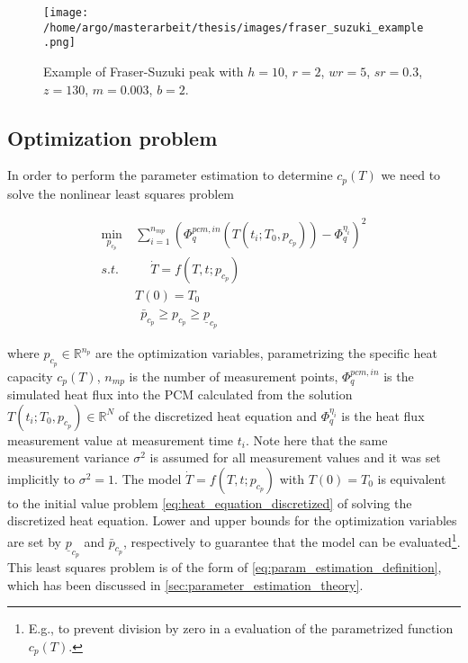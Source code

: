 \documentclass{scrartcl}[12pt, halfparskip]
\numberwithin{equation}{section}
\numberwithin{figure}{section}
\numberwithin{table}{section}
\begin{document}
\begin{figure}[H]
	\centering
	\texttt{[image: /home/argo/masterarbeit/thesis/images/fraser\_suzuki\_example.png]}
	\caption{Example of Fraser-Suzuki peak with $h=10$, $r=2$, $wr=5$, $sr=0.3$, $z=130$, $m=0.003$, $b=2$.}
	\label{fig:parametrization_example_fraser_suzuki}
\end{figure}











\newpage
\subsection{Optimization problem}
\label{sec:optimization_problem}
In order to perform the parameter estimation to determine $c_p(T)$ we need to solve the nonlinear least squares problem

\begin{align}
	\min_{p_{c_p}} \ & \sum_{i=1}^{n_{mp}} \left(  \varPhi_{q}^{pcm,in}(T(t_i;T_0,p_{c_p})) - \varPhi_q^{\eta_i} \right)^2 \label{eq:parameter_estimation_least_squares_problem} \\
	s.t. \ & \quad \  \dot{T} = f(T,t;p_{c_p}) \nonumber \\
	& T(0) = T_0 \nonumber \\
	& \ \ \bar{p}_{c_p} \ge p_{c_p} \ge \underline{p}_{c_p} \nonumber
\end{align}

where $p_{c_p} \in \mathbb{R}^{n_p}$ are the optimization variables, parametrizing the specific heat capacity $c_p(T)$, $n_{{mp}}$ is the number of measurement points, $\varPhi_{q}^{pcm,in}$ is the simulated heat flux into the PCM calculated from the solution $T(t_i;T_0,p_{c_p}) \in \mathbb{R}^N$ of the discretized heat equation and $\varPhi_q^{\eta_i}$ is the heat flux measurement value at measurement time $t_i$. 
Note here that the same measurement variance $\sigma^2$ is assumed for all measurement values and it was set implicitly to $\sigma^2=1$.
The model $\dot{T} = f(T,t;p_{c_p})$ with $T(0) = T_0$ is equivalent to the initial value problem \cref{eq:heat_equation_discretized} of solving the discretized heat equation. Lower and upper bounds for the optimization variables are set by $\underline{p}_{c_p}$ and $\bar{p}_{c_p}$, respectively to guarantee that the model can be evaluated\footnote{E.g., to prevent division by zero in a evaluation of the parametrized function $c_p(T)$.}.
This least squares problem is of the form of \cref{eq:param_estimation_definition}, which has been discussed in \cref{sec:parameter_estimation_theory}.
\end{document}
